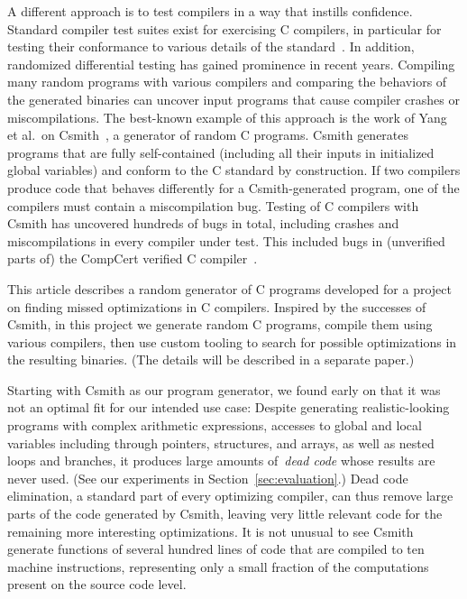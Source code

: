 \documentclass{llncs}
\begin{document}
A different approach is to test compilers in a way that instills confidence.
Standard compiler test suites exist for exercising C compilers, in
particular for testing their conformance to various details of the
standard~\cite{perennial,plumhall}.
In addition, randomized differential testing has gained prominence in recent
years. Compiling many random programs with various compilers and comparing the
behaviors
of the generated binaries can uncover input programs that cause compiler
crashes or miscompilations. The best-known example of this approach is the
work of Yang et al.\ on Csmith~\cite{csmith-2011}, a generator of random C
programs. Csmith generates programs that are fully self-contained (including
all their inputs in initialized global variables) and conform to the C
standard by construction. If two compilers produce code that behaves
differently for a Csmith-generated program, one of the compilers must
contain a miscompilation bug. Testing of C compilers with Csmith has
uncovered hundreds of bugs in total, including crashes and miscompilations
in every compiler under test. This included bugs in (unverified parts of)
the CompCert verified C compiler~\cite{csmith-2011}.

This article describes a random generator of C programs developed for a
project on finding missed optimizations in C compilers. Inspired by the
successes of Csmith, in this project we generate random C programs, compile
them using various compilers, then use custom tooling to search for possible
optimizations in the resulting binaries. (The details will be described in a
separate paper.) 

Starting with Csmith as our program generator, we found early on that it was
not an optimal fit for our intended use case: Despite generating
realistic-looking programs with complex arithmetic expressions, accesses to
global and local variables including through pointers, structures, and
arrays, as well as nested loops and branches, it produces large amounts
of~\emph{dead code} whose results are never used. (See our experiments in
Section~\ref{sec:evaluation}.) Dead code elimination, a
standard part of every optimizing compiler, can thus remove large parts of
the code generated by Csmith, leaving very little relevant code for the
remaining more interesting optimizations. It is not unusual to see Csmith
generate functions of several hundred lines of code that are compiled to ten
machine instructions, representing only a small fraction of the computations
present on the source code level.
\end{document}
